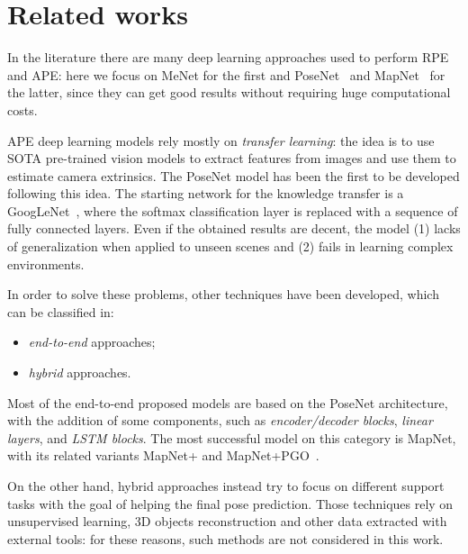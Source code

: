 \section{Related works}
In the literature there are many deep learning approaches used to perform RPE and APE: here we focus on MeNet for the first and PoseNet~\cite{9348762} and MapNet~\cite{DBLP:journals/corr/abs-1712-03342} for the latter, since they can get good results without requiring huge computational costs.

APE deep learning models rely mostly on \emph{transfer learning}: the idea is to use SOTA pre-trained vision models to extract features from images and use them to estimate camera extrinsics.
The PoseNet model has been the first to be developed following this idea. The starting network for the knowledge transfer is a GoogLeNet~\cite{googlenet}, where the softmax classification layer is replaced with a sequence of fully connected layers. Even if the obtained results are decent, the model (1) lacks of generalization when applied to unseen scenes and (2) fails in learning complex environments.

In order to solve these problems, other techniques have been developed, which can be classified in:
\begin{itemize}
    \item \emph{end-to-end} approaches;
    \item \emph{hybrid} approaches.
\end{itemize}

Most of the end-to-end proposed models are based on the PoseNet architecture, with the addition of some components, such as \emph{encoder/decoder blocks}, \emph{linear layers}, and \emph{LSTM blocks}. The most successful model on this category is MapNet, with its related variants MapNet+ and MapNet+PGO~\cite{DBLP:journals/corr/abs-1712-03342}.

On the other hand, hybrid approaches instead try to focus on different support tasks with the goal of helping the final pose prediction. Those techniques rely on unsupervised learning, 3D objects reconstruction and other data extracted with external tools: for these reasons, such methods are not considered in this work.
